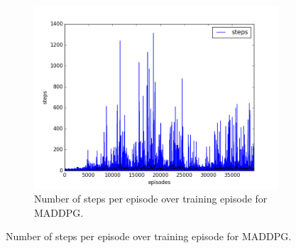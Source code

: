 \begin{figure}[h]
\begin{subfigure}[h]{\figscale\linewidth}
  \end{subfigure}
  ~
  \begin{subfigure}[h]{\figscale\linewidth}
    \includegraphics[trim=10 10 10 10,clip,width=\linewidth]
    {../results/maddpg_2vs1/steps.png}
    \caption{Number of steps per episode over training episode for MADDPG.}
    \label{fig:maddpg-2vs1-steps}
  \end{subfigure}


\end{figure}
